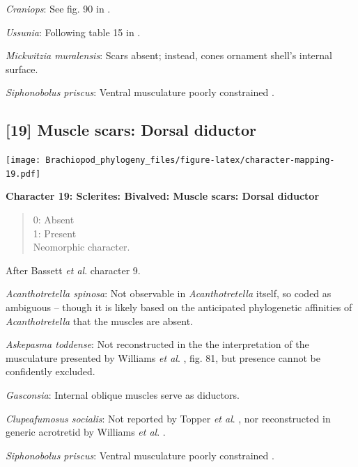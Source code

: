 \documentclass[openany]{book}
\theoremstyle{definition}
\theoremstyle{definition}
\theoremstyle{definition}
\theoremstyle{remark}
\begin{document}
\emph{Craniops}: See fig. 90 in
\citet{Williams2000BrachiopodaLinguliformea}.

\emph{Ussunia}: Following table 15 in
\citet{Williams2000BrachiopodaLinguliformea}.

\emph{Mickwitzia muralensis}: Scars absent; instead, cones ornament
shell's internal surface.

\emph{Siphonobolus priscus}: Ventral musculature poorly constrained
\citep{Williams2000BrachiopodaLinguliformea, Popov2009Earlyontogeny}.

\hypertarget{muscle-scars-dorsal-diductor}{%
\subsection*{{[}19{]} Muscle scars: Dorsal
diductor}\label{muscle-scars-dorsal-diductor}}

\texttt{[image: Brachiopod\_phylogeny\_files/figure-latex/character-mapping-19.pdf]}

\textbf{Character 19: Sclerites: Bivalved: Muscle scars: Dorsal
diductor}

\begin{quote}
0: Absent\\
1: Present\\
Neomorphic character.
\end{quote}

After Bassett \emph{et al}.
\citeyearpar{Bassett2001Functionalmorphology} character 9.

\emph{Acanthotretella spinosa}: Not observable in \emph{Acanthotretella}
itself, so coded as ambiguous -- though it is likely based on the
anticipated phylogenetic affinities of \emph{Acanthotretella} that the
muscles are absent.

\emph{Askepasma toddense}: Not reconstructed in the the interpretation
of the musculature presented by Williams \emph{et al}.
\citeyearpar{Williams2000BrachiopodaLinguliformea}, fig. 81, but
presence cannot be confidently excluded.

\emph{Gasconsia}: Internal oblique muscles serve as diductors.

\emph{Clupeafumosus socialis}: Not reported by Topper \emph{et al}.
\citeyearpar{Topper2013Reappraisalof}, nor reconstructed in generic
acrotretid by Williams \emph{et al}.
\citeyearpar{Williams2000BrachiopodaLinguliformea}.

\emph{Siphonobolus priscus}: Ventral musculature poorly constrained
\citep{Williams2000BrachiopodaLinguliformea, Popov2009Earlyontogeny}.
\end{document}
